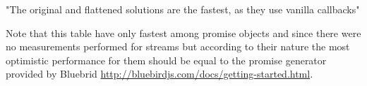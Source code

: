 "The original and flattened solutions are the fastest, as they use vanilla callbacks"\cite{asyncPerformance}

Note that this table have only fastest among promise objects and since there were no measurements performed for streams but according to their nature the most optimistic performance for them should be equal to the promise generator provided by Bluebrid \url{http://bluebirdjs.com/docs/getting-started.html}.



